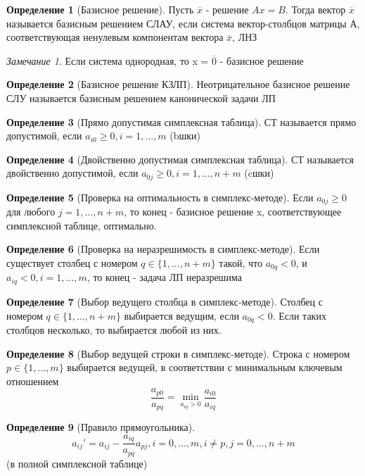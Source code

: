 \documentclass[a4paper]{article}
\theoremstyle{definition}
\newtheorem*{definition}{Определение}
\theoremstyle{remark}
\newtheorem*{remark}{Замечание}
\begin{document}
\begin{definition}[Базисное решение]
    Пусть $\overline{x}$ - решение $Ax = B$. Тогда вектор $\overline{x}$ называется базисным решением СЛАУ, если система вектор-столбцов матрицы А, соответствующая ненулевым компонентам вектора $\overline{x}$, ЛНЗ
\end{definition}\begin{remark}
    Если система однородная, то x = $\overline{0}$ - базисное решение
\end{remark}
\begin{definition}[Базисное решение КЗЛП]
    Неотрицательное базисное решение СЛУ называется базисным решением канонической задачи ЛП
\end{definition}

\begin{definition}[Прямо допустимая симплексная таблица]
	СТ называется прямо допустимой, если $a_{i0}\geq 0, i = 1, \dots, m$ (bшки)
\end{definition}
\begin{definition}[Двойственно допустимая симплексная таблица]
	СТ называется двойственно допустимой, если $a_{0j}\geq 0, i = 1, \dots, n+m$ (cшки)
\end{definition}
\begin{definition}[Проверка на оптимальность в симплекс-методе]
	Если $a_{0j} \ge 0$ для любого $j=1,…,n+m$, то конец - базисное решение x, соответствующее 
	симплексной таблице, оптимально.
\end{definition}
\begin{definition}[Проверка на неразрешимость в симплекс-методе]
	Если существует столбец с номером $q\in \{1,...,n+m\}$ такой, что $a_{0q}<0$, и $a_{iq}<0, i=1,…,m$, то 
конец - задача ЛП неразрешима
\end{definition}
\begin{definition}[Выбор ведущего столбца в симплекс-методе]
	Столбец с номером $q\in\{1,...,n+m\}$ выбирается ведущим, если $a_{0q}<0$. Если таких столбцов 
несколько, то выбирается любой из них.
\end{definition}
\begin{definition}[Выбор ведущей строки в симплекс-методе]
	Строка с номером $p\in\{1,...,m\}$ выбирается ведущей, в соответствии с минимальным 
ключевым отношением
\[\frac{a_{p0}}{a_{pq}} = \min_{a_{iq}>0}\frac{a_{i0}}{a_{iq}}\]
\end{definition}
\begin{definition}[Правило прямоугольника]
	\[a_{ij}' = a_{ij} - \frac{a_{iq}}{a_{pq}}a_{pj}, i = 0, \dots, m, i\neq p, j = 0, \dots, n+m\]
	(в полной симплексной таблице)
\end{definition}
\end{document}
